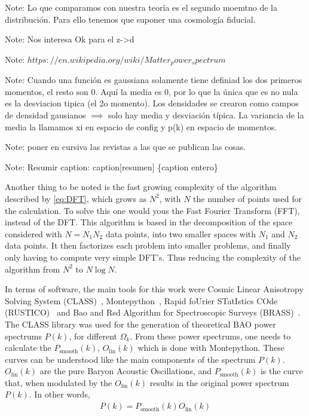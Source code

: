 Note: Lo que comparamos con nuestra teoría es el segundo moemtno de la distribución. Para ello tenemos que suponer una cosmología fiducial. 

Note: Nos interesa Ok para el z->d

Note: $https://en.wikipedia.org/wiki/Matter_power_spectrum$

Note: Cuando una función es gaussiana solamente tiene definiad los dos primeros momentos, el resto son 0. Aquí la media es 0, por lo que la única que es no nula es la desviacion tipica (el 2o momento). Los densidades se crearon como campos de densidad gausianos $\implies$ solo hay media y desviación típica. La variancia de la media la llamamos xi en espacio de config y p(k) en espacio de momentos. 

Note: poner en cursiva las revistas a las que se publican las cosas.

Note: Resumir caption: caption[resumen] \{caption entero\}


Another thing to be noted is the fast growing complexity of the algorithm described by \eqref{eq:DFT}, which grows as $N^2$, with $N$ the number of points used for the calculation. 
To solve this one would yous the Fast Fourier Transform (FFT), instead of the DFT. This algorithm is based in the decomposition of the space considered with $N=N_1N_2$ data points, into two smaller spaces with $N_1$ and $N_2$ data points. It then factorizes each problem into smaller problems, and finally only having to compute very simple DFT's. Thus reducing the complexity of the algorithm from $N^2$ to $N\log N$. 

In terms of software, the main tools for this work were Cosmic Linear Anisotropy Solving System (CLASS)~\cite{class}, Montepython~\cite{montepython}, Rapid foUrier STatIstics COde (RUSTICO)~\cite{rustico} and Bao and Rsd Algorithm for Spectroscopic Surveys (BRASS)~\cite{brass}. \\

The CLASS library was used for the generation of theoretical BAO power spectrums $P(k)$, for different $\Omega_k$. From these power spectrums, one needs to calculate the $P_\text{smooth}(k)$, $O_{\text{lin}}(k)$ which is done with Montepython. These curves can be understood like the main components of the spectrum $P(k)$. $O_{\text{lin}}(k)$ are the pure Baryon Acoustic Oscillations, and $P_{\text{smooth}}(k)$ is the curve that, when modulated by the $O_{\text{lin}}(k)$ results in the original power spectrum $P(k)$. In other words, 
\begin{align}
	P(k) = P_{\text{smooth}}(k) O_{\text{lin}}(k)
\end{align}


